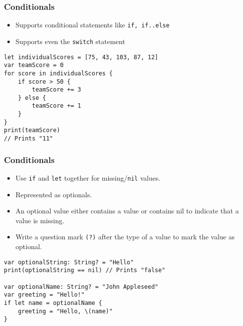 \begin{frame}[fragile] \frametitle{Conditionals}

\begin{itemize}
\item Supports conditional statements like \lstinline|if, if..else|
\item Supports even the \lstinline|switch| statement
\end{itemize}

\begin{lstlisting}
let individualScores = [75, 43, 103, 87, 12]
var teamScore = 0
for score in individualScores {
    if score > 50 {
        teamScore += 3
    } else {
        teamScore += 1
    }
}
print(teamScore)
// Prints "11"
\end{lstlisting}
\end{frame}

\begin{frame}[fragile] \frametitle{Conditionals}

\begin{itemize}
\item Use \lstinline|if| and \lstinline|let| together for missing/\lstinline|nil| values.
\item Represented as optionals. 
\item An optional value either contains a value or contains nil to indicate that a value is missing. 
\item Write a question mark \lstinline|(?)| after the type of a value to mark the value as optional.
\end{itemize}

\begin{lstlisting}
var optionalString: String? = "Hello"
print(optionalString == nil) // Prints "false"

var optionalName: String? = "John Appleseed"
var greeting = "Hello!"
if let name = optionalName {
    greeting = "Hello, \(name)"
}
\end{lstlisting}

\end{frame}

